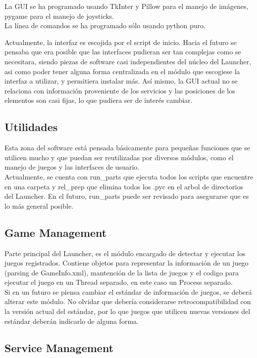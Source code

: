 \documentclass[language=spanish]{article}
\begin{document}
La GUI se ha programado usando TkInter y Pillow para el manejo de imágenes, pygame para el manejo de joysticks.\\
La línea de comandos se ha programado sólo usando python puro.

Actualmente, la interfaz es escojida por el script de inicio. Hacia el futuro se pensaba que era posible que las interfaces pudieran ser tan complejas como se necesitara, siendo piezas de software casi independientes del núcleo del Launcher, asi como poder tener alguna forma centralizada en el módulo que escogiese la interfaz a utilizar, y permitiera instalar más.
Así mismo, la GUI actual no se relaciona con información proveniente de los servicios y las posiciones de los elementos son casi fijas, lo que pudiera ser de interés cambiar.

\subsection{Utilidades}

Esta zona del software está pensada básicamente para pequeñas funciones que se utilicen mucho y que puedan ser reutilizadas por diversos módulos, como el manejo de juegos y las interfaces de usuario.\\
Actualmente, se cuenta con run\_parts que ejecuta todos los scripts que encuentre en una carpeta y rel\_prep que elimina todos los .pyc en el arbol de directorios del Launcher.
En el futuro, run\_parts puede ser revisado para asegurarse que es lo más general posible.

\subsection{Game Management}

Parte principal del Launcher, es el módulo encargado de detectar y ejecutar los juegos registrados. Contiene objetos para representar la información de un juego (parsing de GameInfo.xml), mantención de la lista de juegos y el codigo para ejecutar el juego en un Thread separado, en este caso un Process separado.\\

Si en un futuro se piensa cambiar el estándar de información de juegos, se deberá alterar este módulo. No olvidar que debería considerarse retrocompatibilidad con la versión actual del estándar, por lo que juegos que utilicen nuevas versiones del estándar deberán indicarlo de alguna forma.

\subsection{Service Management}
\end{document}

